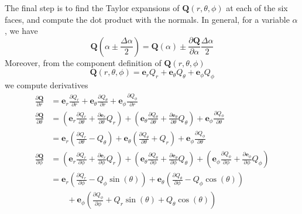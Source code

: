 \documentclass[a4paper]{article}
\begin{document}
The final step is to find the Taylor expansions of \( \pmb{Q}\!\left( r,\theta,\phi \right) \) at each of the six faces, and compute the dot product with the normals. In general, for a variable \( \alpha \), we have
\[
	\pmb{Q}\!\left( \alpha \pm \frac{\Delta \alpha}{2} \right) = \pmb{Q}\!\left( \alpha \right) \pm \frac{\partial \pmb{Q}}{\partial \alpha}\frac{\Delta \alpha}{2}
\]
Moreover, from the component definition of \( \pmb{Q}\!\left( r,\theta,\phi \right) \)
\[
	\pmb{Q}\!\left( r,\theta,\phi \right) = \pmb{e}_{r}Q_{r} + \pmb{e}_{\theta}Q_{\theta} + \pmb{e}_{\phi}Q_{\phi}
\]
we compute derivatives
\begin{align*}
	\frac{\partial \pmb{Q}}{\partial r} & = \pmb{e}_{r}\frac{\partial Q_{r}}{\partial r} + \pmb{e}_{\theta}\frac{\partial Q_{\theta}}{\partial r} + \pmb{e}_{\phi}\frac{\partial Q_{\phi}}{\partial r} \\
	\frac{\partial \pmb{Q}}{\partial \theta} & = \!\left( \pmb{e}_{r}\frac{\partial Q_{r}}{\partial \theta} + \frac{\partial \pmb{e}_{r}}{\partial \theta}Q_{r} \right) + \!\left( \pmb{e}_{\theta}\frac{\partial Q_{\theta}}{\partial \theta} + \frac{\partial \pmb{e}_{\theta}}{\partial \theta}Q_{\theta} \right) + \pmb{e}_{\phi}\frac{\partial Q_{\phi}}{\partial \theta} \\
						 & = \pmb{e}_{r}\!\left( \frac{\partial Q_{r}}{\partial \theta} - Q_{\theta} \right) + \pmb{e}_{\theta}\!\left( \frac{\partial Q_{\theta}}{\partial \theta} + Q_{r} \right) + \pmb{e}_{\phi}\frac{\partial Q_{\phi}}{\partial \theta} \\
	\frac{\partial \pmb{Q}}{\partial \phi} & = \!\left( \pmb{e}_{r}\frac{\partial Q_{r}}{\partial \phi} + \frac{\partial \pmb{e}_{r}}{\partial \phi}Q_{r} \right) + \!\left( \pmb{e}_{\theta}\frac{\partial Q_{\theta}}{\partial \phi} + \frac{\partial \pmb{e}_{\theta}}{\partial \phi}Q_{\theta} \right) + \!\left( \pmb{e}_{\phi}\frac{\partial Q_{\phi}}{\partial \phi} + \frac{\partial \pmb{e}_{\phi}}{\partial \phi}Q_{\phi} \right) \\
					       & = \pmb{e}_{r}\!\left( \frac{\partial Q_{r}}{\partial \phi} - Q_{\phi}\sin\!\left(\theta\right) \right) + \pmb{e}_{\theta}\!\left( \frac{\partial Q_{\theta}}{\partial \phi} - Q_{\phi}\cos\!\left(\theta\right) \right) \\
					       & \qquad + \pmb{e}_{\phi}\!\left( \frac{\partial Q_{\phi}}{\partial \phi} + Q_{r}\sin\!\left(\theta\right) + Q_{\theta}\cos\!\left(\theta\right) \right)
\end{align*}
\end{document}
